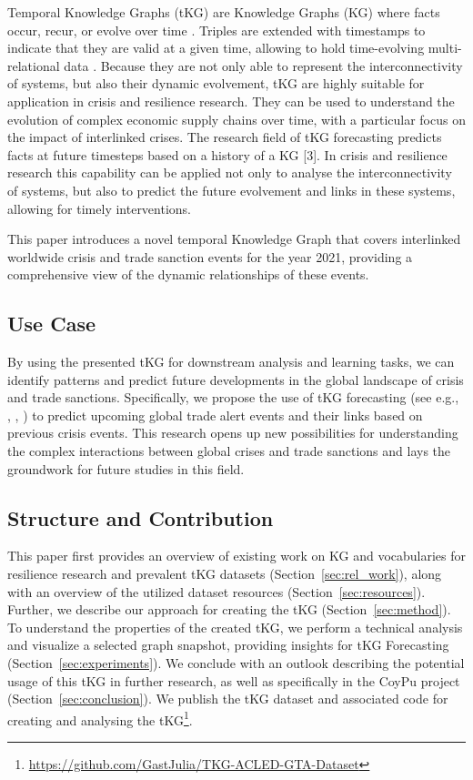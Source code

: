 Temporal Knowledge Graphs (tKG) are Knowledge Graphs (KG) where facts occur, recur, or evolve over time \cite{Trivedi2017}. Triples are extended with timestamps to indicate that they are valid at a given time, allowing to hold time-evolving multi-relational data \cite{Han2021xerte}. Because they are not only able to represent the interconnectivity of systems, but also their dynamic evolvement, tKG are highly suitable for application in crisis and resilience research. They can be used to understand the evolution of complex economic supply chains over time, with a particular focus on the impact of interlinked crises. The research field of tKG forecasting predicts facts at future timesteps based on a history of a KG [3]. In crisis and resilience research this capability can be applied not only to analyse the interconnectivity of systems, but also to predict the future evolvement and links in these systems, allowing for timely interventions.

This paper introduces a novel temporal Knowledge Graph that covers interlinked worldwide crisis and trade sanction events for the year 2021, providing a comprehensive view of the dynamic relationships of these events.

\subsection{Use Case}\label{sec:UseCase}
By using the presented tKG for downstream analysis and learning tasks, we can identify patterns and predict future developments in the global landscape of crisis and trade sanctions. Specifically, we propose the use of tKG forecasting (see e.g.,
\cite{Jin2019oldrenet}, \cite{Li2021regcn}, \cite{Han2021xerte}) to predict upcoming global trade alert events and their links based on previous crisis events. This research opens up new possibilities for understanding the complex interactions between global crises and trade sanctions and lays the groundwork for future studies in this field.

\subsection{Structure and Contribution}
This paper first provides an overview of existing work on KG and vocabularies for resilience research and prevalent tKG datasets (Section~\ref{sec:rel_work}), along with an overview of the utilized dataset resources (Section~\ref{sec:resources}). Further, we describe our approach for creating the tKG (Section~\ref{sec:method}). To understand the properties of the created tKG, we perform a technical analysis and visualize a selected graph snapshot, providing insights for tKG Forecasting (Section~\ref{sec:experiments}). We conclude with an outlook describing the potential usage of this tKG in further research, as well as specifically in the CoyPu project (Section~\ref{sec:conclusion}). We publish the tKG dataset and associated code for creating and analysing the tKG\footnote{\url{https://github.com/GastJulia/TKG-ACLED-GTA-Dataset}}. 

